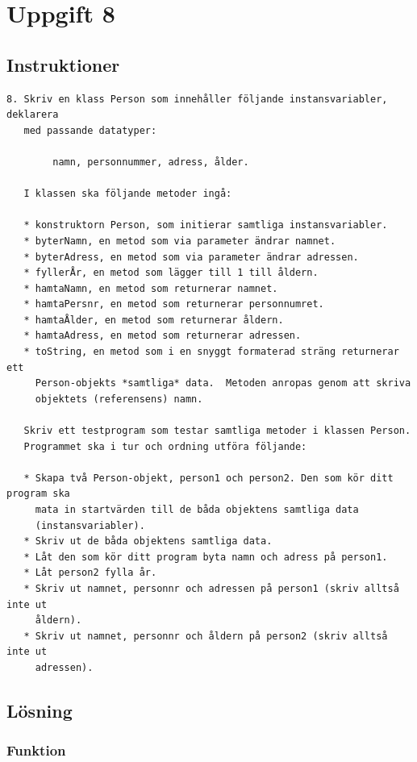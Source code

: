 \section{Uppgift 8}\label{sec:uppg08}

\subsection{Instruktioner}
\begin{verbatim}
8. Skriv en klass Person som innehåller följande instansvariabler, deklarera
   med passande datatyper:

        namn, personnummer, adress, ålder.

   I klassen ska följande metoder ingå:

   * konstruktorn Person, som initierar samtliga instansvariabler.
   * byterNamn, en metod som via parameter ändrar namnet.
   * byterAdress, en metod som via parameter ändrar adressen.
   * fyllerÅr, en metod som lägger till 1 till åldern.
   * hamtaNamn, en metod som returnerar namnet.
   * hamtaPersnr, en metod som returnerar personnumret.
   * hamtaÅlder, en metod som returnerar åldern.
   * hamtaAdress, en metod som returnerar adressen.
   * toString, en metod som i en snyggt formaterad sträng returnerar ett
     Person-objekts *samtliga* data.  Metoden anropas genom att skriva
     objektets (referensens) namn.

   Skriv ett testprogram som testar samtliga metoder i klassen Person.
   Programmet ska i tur och ordning utföra följande:

   * Skapa två Person-objekt, person1 och person2. Den som kör ditt program ska
     mata in startvärden till de båda objektens samtliga data
     (instansvariabler).
   * Skriv ut de båda objektens samtliga data.
   * Låt den som kör ditt program byta namn och adress på person1.
   * Låt person2 fylla år.
   * Skriv ut namnet, personnr och adressen på person1 (skriv alltså inte ut
     åldern).
   * Skriv ut namnet, personnr och åldern på person2 (skriv alltså inte ut
     adressen).
\end{verbatim}


\subsection{Lösning}
\subsubsection{Funktion}

